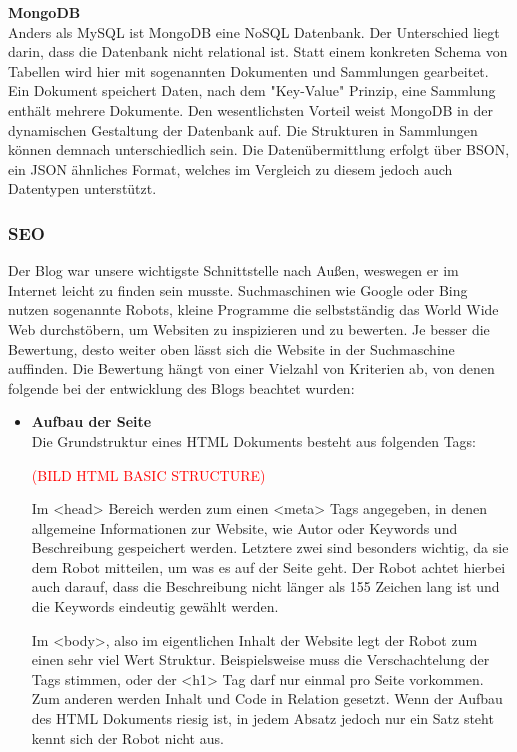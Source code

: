 {    \textbf{MongoDB}\\
    Anders als MySQL ist {MongoDB\cite{mongodb}} eine NoSQL Datenbank. Der Unterschied liegt darin, dass die Datenbank nicht relational ist. Statt einem konkreten Schema von Tabellen
    wird hier mit sogenannten Dokumenten und Sammlungen gearbeitet. Ein Dokument speichert Daten, nach dem "Key-Value" Prinzip, eine Sammlung enthält mehrere Dokumente.
    Den wesentlichsten Vorteil weist MongoDB in der dynamischen Gestaltung der Datenbank auf. Die Strukturen in Sammlungen können demnach unterschiedlich sein. Die
    Datenübermittlung erfolgt über {BSON\cite{bson}}, ein JSON ähnliches Format, welches im Vergleich zu diesem jedoch auch Datentypen unterstützt.

    \subsubsection{SEO}
    Der Blog war unsere wichtigste Schnittstelle nach Außen, weswegen er im Internet leicht zu finden sein musste. Suchmaschinen wie Google oder Bing nutzen
    sogenannte Robots, kleine Programme die selbstständig das World Wide Web durchstöbern, um Websiten zu inspizieren und zu bewerten. Je besser die Bewertung,
    desto weiter oben lässt sich die Website in der Suchmaschine auffinden.
    Die Bewertung hängt von einer Vielzahl von Kriterien ab, von denen folgende bei der entwicklung des Blogs beachtet wurden:

    \begin{itemize}
      \item \textbf{Aufbau der Seite}\\
        Die Grundstruktur eines HTML Dokuments besteht aus folgenden Tags:

        \textcolor{red}{(BILD HTML BASIC STRUCTURE)}

        Im <head> Bereich werden zum einen <meta> Tags angegeben, in denen allgemeine Informationen zur Website, wie Autor oder Keywords und Beschreibung gespeichert werden.
        Letztere zwei sind besonders wichtig, da sie dem Robot mitteilen, um was es auf der Seite geht. Der Robot achtet hierbei auch darauf, dass die Beschreibung nicht
        länger als 155 Zeichen lang ist und die Keywords eindeutig gewählt werden.

        Im <body>, also im eigentlichen Inhalt der Website legt der Robot zum einen sehr viel Wert Struktur. Beispielsweise muss die Verschachtelung der Tags stimmen, oder der <h1> Tag darf nur einmal pro Seite
        vorkommen. Zum anderen werden Inhalt und Code in Relation gesetzt. Wenn der Aufbau des HTML Dokuments riesig ist, in jedem Absatz jedoch nur ein Satz steht kennt sich der Robot nicht aus.


\end{itemize}}

